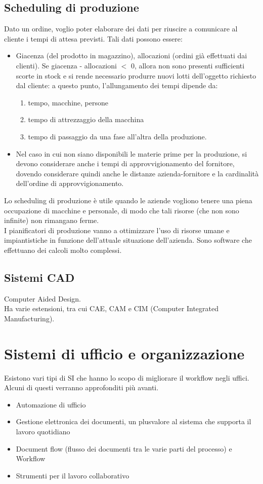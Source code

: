 \subsection{Scheduling di produzione}
\label{sub:Scheduling di produzione}
Dato un ordine, voglio poter elaborare dei dati per riuscire a comunicare al cliente i tempi di attesa previsti. Tali dati possono essere:
\begin{itemize}
  \item Giacenza (del prodotto in magazzino), allocazioni (ordini gi\`a effettuati dai clienti).
  Se giacenza - allocazioni $<$ 0, allora non sono presenti sufficienti scorte in stock e si rende necessario produrre nuovi lotti dell'oggetto richiesto dal cliente: a questo punto, l'allungamento dei tempi dipende da:
  \begin{enumerate}
    \item tempo, macchine, persone
    \item tempo di attrezzaggio della macchina
    \item tempo di passaggio da una fase all'altra della produzione.
  \end{enumerate}
  \item
  Nel caso in cui non siano disponibili le materie prime per la produzione, si devono considerare anche i tempi di approvvigionamento del fornitore, dovendo considerare quindi anche le distanze azienda-fornitore e la cardinalit\`a dell'ordine di approvvigionamento.
\end{itemize}
Lo scheduling di produzione \`e utile quando le aziende vogliono tenere una piena occupazione
di macchine e personale, di modo che tali risorse (che non sono infinite) non rimangano ferme.\\
I pianificatori di produzione vanno a ottimizzare l'uso di risorse umane e impiantistiche in funzione
dell'attuale situazione dell'azienda. Sono software che effettuano dei calcoli molto complessi.
\subsection{Sistemi CAD}
\label{sub:Sistemi CAD}
Computer Aided Design.\\
Ha varie estensioni, tra cui CAE, CAM e CIM (Computer Integrated Manufacturing).
\section{Sistemi di ufficio e organizzazione}
\label{sec:Sistemi di ufficio e organizzazione}
Esistono vari tipi di SI che hanno lo scopo di migliorare il workflow negli uffici. Alcuni di questi verranno approfonditi pi\`u avanti.
\begin{itemize}
  \item Automazione di ufficio
  \item Gestione elettronica dei documenti, un plusvalore al sistema che supporta il lavoro quotidiano
  \item Document flow (flusso dei documenti tra le varie parti del processo) e Workflow
  \item Strumenti per il lavoro collaborativo
\end{itemize}
